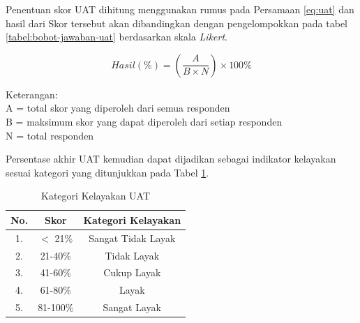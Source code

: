 \begin{enumerate}
          Penentuan skor UAT dihitung menggunakan rumus pada Persamaan \ref{eq:uat} dan hasil dari Skor tersebut akan dibandingkan dengan pengelompokkan pada tabel \ref{tabel:bobot-jawaban-uat} berdasarkan skala \textit{Likert}.


          \begin{equation}
              \label{eq:uat}
              \mathit{Hasil}(\%) = \left(\frac{A}{B \times N}\right) \times 100\%
          \end{equation}

          Keterangan: \\
          A = total skor yang diperoleh dari semua responden \\
          B = maksimum skor yang dapat diperoleh dari setiap responden \\
          N = total responden

          Persentase akhir UAT kemudian dapat dijadikan sebagai indikator kelayakan sesuai kategori yang ditunjukkan pada Tabel \ref{tabel:kategori-kelayakan}.

          \begin{table}[H]
              \centering
              \begin{tabular}{|c|c|c|}
                  \hline
                  \textbf{No.} & \textbf{Skor} & \textbf{Kategori Kelayakan} \\ \hline
                  1.           & $<$ 21\%      & Sangat Tidak Layak          \\ \hline
                  2.           & 21-40\%       & Tidak Layak                 \\ \hline
                  3.           & 41-60\%       & Cukup Layak                 \\ \hline
                  4.           & 61-80\%       & Layak                       \\ \hline
                  5.           & 81-100\%      & Sangat Layak                \\ \hline
              \end{tabular}
              \caption{Kategori Kelayakan UAT}
              \label{tabel:kategori-kelayakan}
          \end{table}

\end{enumerate}